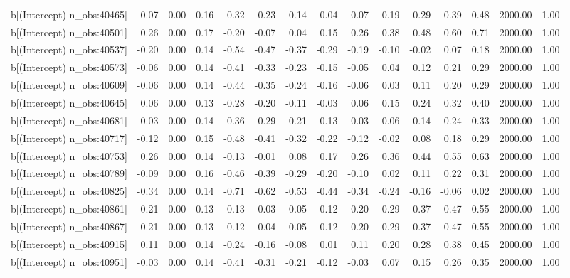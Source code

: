 \begin{table}[ht]
\begin{tabular}{rrrrrrrrrrrrrrr}
  b[(Intercept) n\_obs:40465] & 0.07 & 0.00 & 0.16 & -0.32 & -0.23 & -0.14 & -0.04 & 0.07 & 0.19 & 0.29 & 0.39 & 0.48 & 2000.00 & 1.00 \\ 
  b[(Intercept) n\_obs:40501] & 0.26 & 0.00 & 0.17 & -0.20 & -0.07 & 0.04 & 0.15 & 0.26 & 0.38 & 0.48 & 0.60 & 0.71 & 2000.00 & 1.00 \\ 
  b[(Intercept) n\_obs:40537] & -0.20 & 0.00 & 0.14 & -0.54 & -0.47 & -0.37 & -0.29 & -0.19 & -0.10 & -0.02 & 0.07 & 0.18 & 2000.00 & 1.00 \\ 
  b[(Intercept) n\_obs:40573] & -0.06 & 0.00 & 0.14 & -0.41 & -0.33 & -0.23 & -0.15 & -0.05 & 0.04 & 0.12 & 0.21 & 0.29 & 2000.00 & 1.00 \\ 
  b[(Intercept) n\_obs:40609] & -0.06 & 0.00 & 0.14 & -0.44 & -0.35 & -0.24 & -0.16 & -0.06 & 0.03 & 0.11 & 0.20 & 0.29 & 2000.00 & 1.00 \\ 
  b[(Intercept) n\_obs:40645] & 0.06 & 0.00 & 0.13 & -0.28 & -0.20 & -0.11 & -0.03 & 0.06 & 0.15 & 0.24 & 0.32 & 0.40 & 2000.00 & 1.00 \\ 
  b[(Intercept) n\_obs:40681] & -0.03 & 0.00 & 0.14 & -0.36 & -0.29 & -0.21 & -0.13 & -0.03 & 0.06 & 0.14 & 0.24 & 0.33 & 2000.00 & 1.00 \\ 
  b[(Intercept) n\_obs:40717] & -0.12 & 0.00 & 0.15 & -0.48 & -0.41 & -0.32 & -0.22 & -0.12 & -0.02 & 0.08 & 0.18 & 0.29 & 2000.00 & 1.00 \\ 
  b[(Intercept) n\_obs:40753] & 0.26 & 0.00 & 0.14 & -0.13 & -0.01 & 0.08 & 0.17 & 0.26 & 0.36 & 0.44 & 0.55 & 0.63 & 2000.00 & 1.00 \\ 
  b[(Intercept) n\_obs:40789] & -0.09 & 0.00 & 0.16 & -0.46 & -0.39 & -0.29 & -0.20 & -0.10 & 0.02 & 0.11 & 0.22 & 0.31 & 2000.00 & 1.00 \\ 
  b[(Intercept) n\_obs:40825] & -0.34 & 0.00 & 0.14 & -0.71 & -0.62 & -0.53 & -0.44 & -0.34 & -0.24 & -0.16 & -0.06 & 0.02 & 2000.00 & 1.00 \\ 
  b[(Intercept) n\_obs:40861] & 0.21 & 0.00 & 0.13 & -0.13 & -0.03 & 0.05 & 0.12 & 0.20 & 0.29 & 0.37 & 0.47 & 0.55 & 2000.00 & 1.00 \\ 
  b[(Intercept) n\_obs:40867] & 0.21 & 0.00 & 0.13 & -0.12 & -0.04 & 0.05 & 0.12 & 0.20 & 0.29 & 0.37 & 0.47 & 0.55 & 2000.00 & 1.00 \\ 
  b[(Intercept) n\_obs:40915] & 0.11 & 0.00 & 0.14 & -0.24 & -0.16 & -0.08 & 0.01 & 0.11 & 0.20 & 0.28 & 0.38 & 0.45 & 2000.00 & 1.00 \\ 
  b[(Intercept) n\_obs:40951] & -0.03 & 0.00 & 0.14 & -0.41 & -0.31 & -0.21 & -0.12 & -0.03 & 0.07 & 0.15 & 0.26 & 0.35 & 2000.00 & 1.00 \\ 

\end{tabular}
\end{table}
